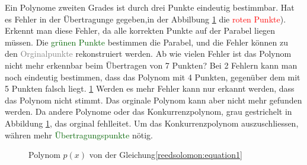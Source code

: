 \begin{beispiel}
Ein Polynome zweiten Grades ist durch drei Punkte eindeutig bestimmbar.
Hat es Fehler in der Übertragunge gegeben,in der Abbilbung \ref{fig:polynom} die \textcolor{red}{roten Punkte}).
Erkennt man diese Fehler, da alle korrekten Punkte auf der Parabel liegen müssen. 
Die \textcolor{darkgreen}{grünen Punkte} bestimmen die Parabel, und die Fehler können zu den 
\textcolor{gray}{Orginalpunkte} rekonstruiert werden.
Ab wie vielen Fehler ist das Polynom nicht mehr erkennbar beim Übertragen von 7 Punkten?
Bei 2 Fehlern kann man noch eindeutig bestimmen, dass das Polynom mit 4 Punkten,
gegenüber dem mit 5 Punkten falsch liegt. \ref{fig:polynom}
Werden es mehr Fehler kann nur erkannt werden, dass das Polynom nicht stimmt.
Das orginale Polynom kann aber nicht mehr gefunden werden.
Da andere Polynome oder das Konkurrenzpolynom, grau gestrichelt in Abbildung \ref{fig:polynom}, das orginal fehlleitet.
Um das Konkurrenzpolynom auszuschliessen, währen mehr \textcolor{darkgreen}{Übertragungspunkte} nötig.
\end{beispiel}

\begin{figure}%
	\centering
    
	\caption{Polynom $p(x)$ von der Gleichung\eqref{reedsolomon:equation1}}
	\label{fig:polynom}
\end{figure}

